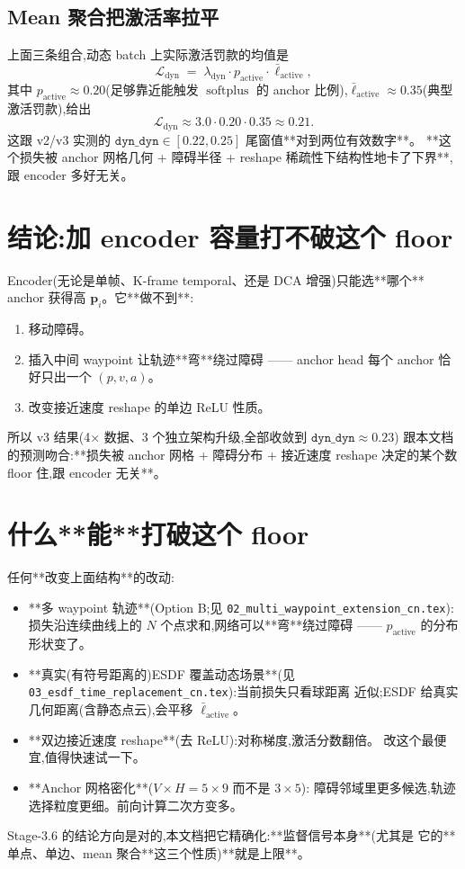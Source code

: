\documentclass[UTF8, 11pt]{ctexart}
\newcommand{\softplus}{\operatorname{softplus}}
\begin{document}
\subsection{Mean 聚合把激活率拉平}

上面三条组合,动态 batch 上实际激活罚款的均值是
\[
\mathcal{L}_{\text{dyn}}
\;=\; \lambda_{\text{dyn}} \cdot p_{\text{active}} \cdot \bar{\ell}_{\text{active}},
\]
其中 $p_{\text{active}} \approx 0.20$(足够靠近能触发 $\softplus$ 的 anchor
比例),$\bar{\ell}_{\text{active}} \approx 0.35$(典型激活罚款),给出
\[
\mathcal{L}_{\text{dyn}} \approx 3.0 \cdot 0.20 \cdot 0.35 \approx 0.21.
\]
这跟 v2/v3 实测的 $\texttt{dyn\_dyn} \in [0.22, 0.25]$ 尾窗值**对到两位有效数字**。
**这个损失被 anchor 网格几何 + 障碍半径 + reshape 稀疏性下结构性地卡了下界**,
跟 encoder 多好无关。

\section{结论:加 encoder 容量打不破这个 floor}

Encoder(无论是单帧、K-frame temporal、还是 DCA 增强)只能选**哪个**
anchor 获得高 $\bm{p}_i$。它**做不到**:
\begin{enumerate}
  \item 移动障碍。
  \item 插入中间 waypoint 让轨迹**弯**绕过障碍 —— anchor head 每个 anchor
        恰好只出一个 $(p, v, a)$。
  \item 改变接近速度 reshape 的单边 ReLU 性质。
\end{enumerate}

所以 v3 结果(4× 数据、3 个独立架构升级,全部收敛到 $\texttt{dyn\_dyn} \approx 0.23$)
跟本文档的预测吻合:**损失被 anchor 网格 + 障碍分布 + 接近速度 reshape
决定的某个数 floor 住,跟 encoder 无关**。

\section{什么**能**打破这个 floor}

任何**改变上面结构**的改动:
\begin{itemize}
  \item **多 waypoint 轨迹**(Option B;见
        \texttt{02\_multi\_waypoint\_extension\_cn.tex}):损失沿连续曲线上的
        $N$ 个点求和,网络可以**弯**绕过障碍 —— $p_{\text{active}}$ 的分布
        形状变了。
  \item **真实(有符号距离的)ESDF 覆盖动态场景**(见
        \texttt{03\_esdf\_time\_replacement\_cn.tex}):当前损失只看球距离
        近似;ESDF 给真实几何距离(含静态点云),会平移 $\bar{\ell}_{\text{active}}$。
  \item **双边接近速度 reshape**(去 ReLU):对称梯度,激活分数翻倍。
        改这个最便宜,值得快速试一下。
  \item **Anchor 网格密化**($V \times H = 5 \times 9$ 而不是 $3 \times 5$):
        障碍邻域里更多候选,轨迹选择粒度更细。前向计算二次方变多。
\end{itemize}

Stage-3.6 的结论方向是对的,本文档把它精确化:**监督信号本身**(尤其是
它的**单点、单边、mean 聚合**这三个性质)**就是上限**。
\end{document}

